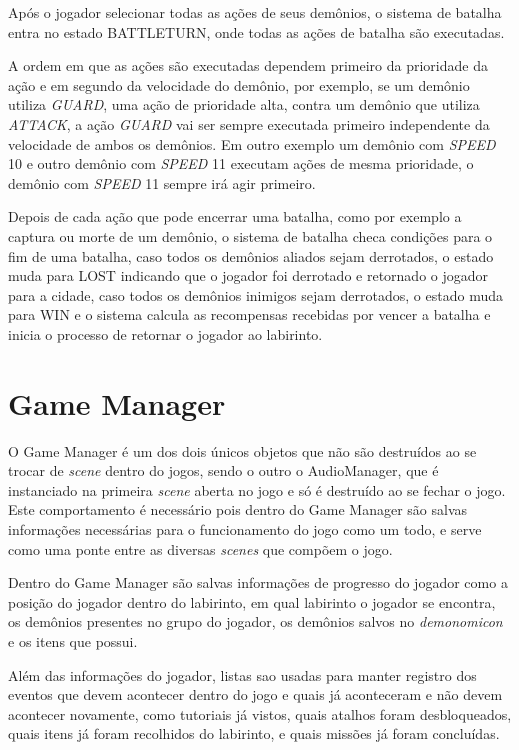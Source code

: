 	Após o jogador selecionar todas as ações de seus demônios, o sistema de batalha entra no  estado BATTLETURN, onde todas as ações de batalha são executadas.
	
	A ordem em que as ações são executadas dependem primeiro da prioridade da ação e em segundo da velocidade do demônio, por exemplo, se um demônio utiliza \emph{GUARD}, uma ação de prioridade alta, contra um demônio que utiliza \emph{ATTACK}, a ação \emph{GUARD} vai ser sempre executada primeiro independente da velocidade de ambos os demônios. Em outro exemplo um demônio com \emph{SPEED} 10 e outro demônio com \emph{SPEED} 11 executam ações de mesma prioridade, o demônio com \emph{SPEED} 11 sempre irá agir primeiro.

	Depois de cada ação que pode encerrar uma batalha, como por exemplo a captura ou morte de um demônio, o sistema de batalha checa condições para o fim de uma batalha, caso todos os demônios aliados sejam derrotados, o estado muda para LOST indicando que o jogador foi derrotado e retornado o jogador para a cidade, caso todos os demônios inimigos sejam derrotados, o estado muda para WIN e o sistema calcula as recompensas recebidas por vencer a batalha e inicia o processo de retornar o jogador ao labirinto.

\section{Game Manager}

	O Game Manager é um dos dois únicos objetos que não são destruídos ao se trocar de \emph{scene} dentro do jogos, sendo o outro o AudioManager, que é instanciado na primeira \emph{scene} aberta no jogo e só é destruído ao se fechar o jogo. Este comportamento é necessário pois dentro do Game Manager são salvas informações necessárias para o funcionamento do jogo como um todo, e serve como uma ponte entre as diversas \emph{scenes} que compõem o jogo.
	
	Dentro do Game Manager são salvas informações de progresso do jogador como a posição do jogador dentro do labirinto, em qual labirinto o jogador se encontra, os demônios presentes no grupo do jogador, os demônios salvos no \emph{demonomicon} e os itens que possui.
	
	Além das informações do jogador, listas sao usadas para manter registro dos eventos que devem acontecer dentro do jogo e quais já aconteceram e não devem acontecer novamente, como tutoriais já vistos, quais atalhos foram desbloqueados, quais itens já foram recolhidos do labirinto, e quais missões já foram concluídas.
	
